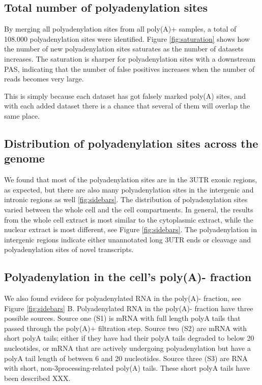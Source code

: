 \subsection{Total number of polyadenylation sites}
By merging all polyadenylation sites from all poly(A)+ samples, a total of
108.000 polyadenylation sites were identified. Figure \ref{fig:saturation}
shows how the number of new polyadenylation sites saturates as the number of
datasets increases. The saturation is sharper for polyadenylation sites with a
downstream PAS, indicating that the number of false positives increases when
the number of reads becomes very large.

This is simply because each dataset has got falsely marked poly(A) sites, and
with each added dataset there is a chance that several of them will overlap the
same place.

\subsection{Distribution of polyadenylation sites across the genome}
We found that most of the polyadenylation sites are in the 3\p UTR exonic
regions, as expected, but there are also many polyadenylation sites in the
intergenic and intronic regions as well \ref{fig:sidebars}. The distribution of
polyadenylation sites varied between the whole cell and the cell compartments.
In general, the results from the whole cell extract is most similar to the
cytoplasmic extract, while the nuclear extract is most different, 
see Figure \ref{fig:sidebars}. The polyadenylation in intergenic regions
indicate either unannotated long 3\p UTR ends or cleavage and polyadenylation
sites of novel transcripts.

\subsection{Polyadenylation in the cell's poly(A)- fraction}
We also found evidece for polyadenylated RNA in the poly(A)- fraction, see
Figure \ref{fig:sidebars} B. Polyadenylated RNA in the poly(A)- fraction have
three possible sources. Source one (S1) is mRNA with full length polyA tails
that passed through the poly(A)+ filtration step. Source two (S2) are mRNA with
short polyA tails; either if they have had their polyA tails degraded to below
20 nucleotides, or mRNA that are actively undergoing polyadenylation but have a
polyA tail length of between 6 and 20 nucleotides. Source three (S3) are RNA
with short, non-3\p processing-related poly(A) tails.  These short polyA tails
have been described XXX.


